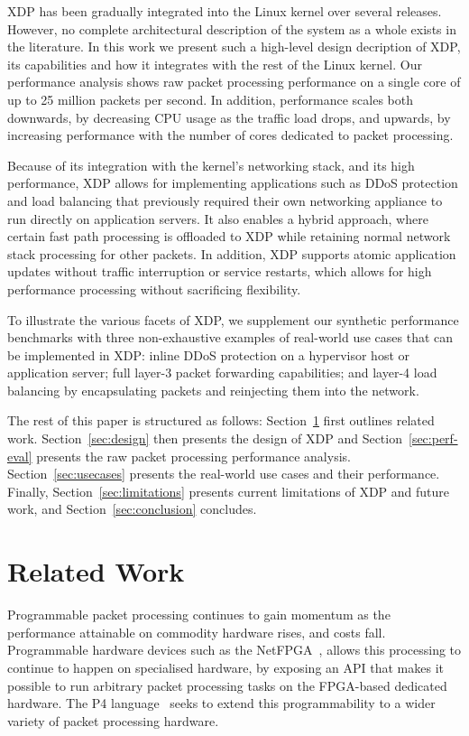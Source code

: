 \documentclass[10pt,sigconf]{acmart}
\begin{document}
XDP has been gradually integrated into the Linux kernel over several releases.
However, no complete architectural description of the system as a whole exists
in the literature. In this work we present such a high-level design decription
of XDP, its capabilities and how it integrates with the rest of the Linux
kernel. Our performance analysis shows raw packet processing performance on a
single core of up to 25 million packets per second. In addition, performance
scales both downwards, by decreasing CPU usage as the traffic load drops, and
upwards, by increasing performance with the number of cores dedicated to packet
processing.

Because of its integration with the kernel's networking stack, and its high
performance, XDP allows for implementing applications such as DDoS protection
and load balancing that previously required their own networking appliance to
run directly on application servers. It also enables a hybrid approach, where
certain fast path processing is offloaded to XDP while retaining normal network
stack processing for other packets. In addition, XDP supports atomic application
updates without traffic interruption or service restarts, which allows for high
performance processing without sacrificing flexibility.

To illustrate the various facets of XDP, we supplement our synthetic performance
benchmarks with three non-exhaustive examples of real-world use cases that can
be implemented in XDP: inline DDoS protection on a hypervisor host or
application server; full layer-3 packet forwarding capabilities; and layer-4
load balancing by encapsulating packets and reinjecting them into the network.

The rest of this paper is structured as follows: Section~\ref{sec:related-work}
first outlines related work. Section~\ref{sec:design} then presents the design
of XDP and Section~\ref{sec:perf-eval} presents the raw packet processing
performance analysis. Section~\ref{sec:usecases} presents the real-world use
cases and their performance. Finally, Section~\ref{sec:limitations} presents
current limitations of XDP and future work, and Section~\ref{sec:conclusion}
concludes.

\section{Related Work}%
\label{sec:related-work}

Programmable packet processing continues to gain momentum as the performance
attainable on commodity hardware rises, and costs fall. Programmable hardware
devices such as the NetFPGA~\cite{lockwood2007netfpga}, allows this processing
to continue to happen on specialised hardware, by exposing an API that makes it
possible to run arbitrary packet processing tasks on the FPGA-based dedicated
hardware. The P4 language~\cite{bosshart2014p4} seeks to extend this
programmability to a wider variety of packet processing hardware.
\end{document}
